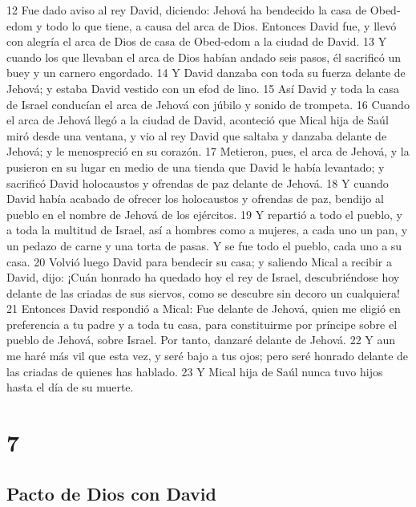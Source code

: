 12 Fue dado aviso al rey David, diciendo: Jehová ha bendecido la casa de Obed-edom y todo lo que tiene, a causa del arca de Dios. Entonces David fue, y llevó con alegría el arca de Dios de casa de Obed-edom a la ciudad de David.
13 Y cuando los que llevaban el arca de Dios habían andado seis pasos, él sacrificó un buey y un carnero engordado.
14 Y David danzaba con toda su fuerza delante de Jehová; y estaba David vestido con un efod de lino.
15 Así David y toda la casa de Israel conducían el arca de Jehová con júbilo y sonido de trompeta.
16 Cuando el arca de Jehová llegó a la ciudad de David, aconteció que Mical hija de Saúl miró desde una ventana, y vio al rey David que saltaba y danzaba delante de Jehová; y le menospreció en su corazón.
17 Metieron, pues, el arca de Jehová, y la pusieron en su lugar en medio de una tienda que David le había levantado; y sacrificó David holocaustos y ofrendas de paz delante de Jehová.
18 Y cuando David había acabado de ofrecer los holocaustos y ofrendas de paz, bendijo al pueblo en el nombre de Jehová de los ejércitos.
19 Y repartió a todo el pueblo, y a toda la multitud de Israel, así a hombres como a mujeres, a cada uno un pan, y un pedazo de carne y una torta de pasas. Y se fue todo el pueblo, cada uno a su casa.
20 Volvió luego David para bendecir su casa; y saliendo Mical a recibir a David, dijo: ¡Cuán honrado ha quedado hoy el rey de Israel, descubriéndose hoy delante de las criadas de sus siervos, como se descubre sin decoro un cualquiera!
21 Entonces David respondió a Mical: Fue delante de Jehová, quien me eligió en preferencia a tu padre y a toda tu casa, para constituirme por príncipe sobre el pueblo de Jehová, sobre Israel. Por tanto, danzaré delante de Jehová.
22 Y aun me haré más vil que esta vez, y seré bajo a tus ojos; pero seré honrado delante de las criadas de quienes has hablado. 
23 Y Mical hija de Saúl nunca tuvo hijos hasta el día de su muerte.

\chapter{7}

\section*{Pacto de Dios con David}


